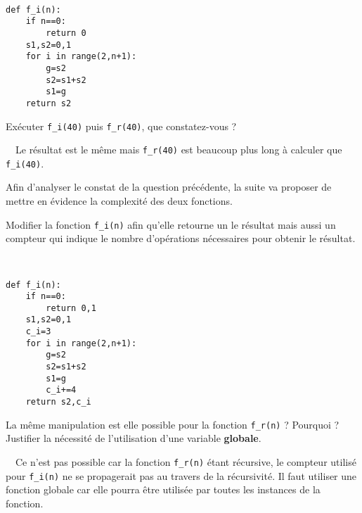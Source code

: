 \begin{solution}~\ 
\begin{verbatim}
def f_i(n):
    if n==0:
        return 0
    s1,s2=0,1
    for i in range(2,n+1):
        g=s2
        s2=s1+s2
        s1=g
    return s2
\end{verbatim}
\end{solution}
    
\begin{exercice}
Exécuter \verb?f_i(40)? puis \verb?f_r(40)?, que constatez-vous ?
\end{exercice}

\begin{solution}~\ 
Le résultat est le même mais \verb?f_r(40)? est beaucoup plus long à calculer que \verb?f_i(40)?.
\end{solution}

Afin d'analyser le constat de la question précédente, la suite va proposer de mettre en évidence la complexité des deux fonctions.

\begin{exercice}
Modifier la fonction \verb?f_i(n)? afin qu'elle retourne un le résultat mais aussi un compteur qui indique le nombre d'opérations nécessaires pour obtenir le résultat.
\end{exercice}

\begin{solution}~\ 
\begin{verbatim}
def f_i(n):
    if n==0:
        return 0,1
    s1,s2=0,1
    c_i=3
    for i in range(2,n+1):
        g=s2
        s2=s1+s2
        s1=g
        c_i+=4
    return s2,c_i
\end{verbatim}
\end{solution}

\begin{exercice}
La même manipulation est elle possible pour la fonction \verb?f_r(n)? ? Pourquoi ? Justifier la nécessité de l'utilisation d'une variable \textbf{globale}.
\end{exercice}

\begin{solution}~\ 
Ce n'est pas possible car la fonction \verb?f_r(n)? étant récursive, le compteur utilisé pour \verb?f_i(n)? ne se propagerait pas au travers de la récursivité. Il faut utiliser une fonction globale car elle pourra être utilisée par toutes les instances de la fonction.
\end{solution}

